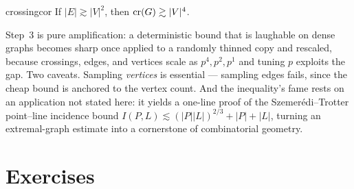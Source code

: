 \begin{corollary}{}{crossingcor}
If $|E|\gtrsim|V|^2$, then $\operatorname{cr}(G)\gtrsim|V|^4$.
\end{corollary}

\begin{insight}
Step~3 is pure amplification: a deterministic bound that is laughable on dense
graphs becomes sharp once applied to a randomly thinned copy and rescaled,
because crossings, edges, and vertices scale as $p^4,p^2,p^1$ and tuning $p$
exploits the gap. Two caveats. Sampling \emph{vertices} is essential ---
sampling edges fails, since the cheap bound is anchored to the vertex count.
And the inequality's fame rests on an application not stated here: it yields a
one-line proof of the Szemer\'edi--Trotter point--line incidence bound
$I(P,L)\lesssim(|P||L|)^{2/3}+|P|+|L|$, turning an extremal-graph estimate into
a cornerstone of combinatorial geometry.
\end{insight}

\section*{Exercises}

